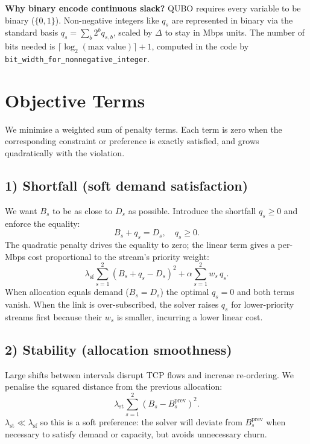 \documentclass[11pt,a4paper]{article}
\begin{document}
\bigskip
\noindent\textbf{Why binary encode continuous slack?}
QUBO requires every variable to be binary ($\{0,1\}$).  Non-negative integers
like $q_s$ are represented in binary via the standard basis
$q_s = \sum_b 2^b q_{s,b}$, scaled by $\Delta$ to stay in Mbps units.
The number of bits needed is $\lceil\log_2(\text{max value})\rceil + 1$, computed
in the code by \texttt{bit\_width\_for\_nonnegative\_integer}.

\section*{Objective Terms}

We minimise a weighted sum of penalty terms.  Each term is zero when the
corresponding constraint or preference is exactly satisfied, and grows
quadratically with the violation.

\subsection*{1) Shortfall (soft demand satisfaction)}

We want $B_s$ to be as close to $D_s$ as possible.  Introduce the shortfall
$q_s \ge 0$ and enforce the equality:
\[
B_s + q_s = D_s,\quad q_s\ge 0.
\]
The quadratic penalty drives the equality to zero; the linear term gives a
per-Mbps cost proportional to the stream's priority weight:
\[
\lambda_{\text{sf}}\sum_{s=1}^2 (B_s + q_s - D_s)^2
+ \alpha\sum_{s=1}^2 w_s\, q_s.
\]
When allocation equals demand ($B_s = D_s$) the optimal $q_s = 0$ and both
terms vanish.  When the link is over-subscribed, the solver raises $q_s$ for
lower-priority streams first because their $w_s$ is smaller, incurring a
lower linear cost.

\subsection*{2) Stability (allocation smoothness)}

Large shifts between intervals disrupt TCP flows and increase re-ordering.
We penalise the squared distance from the previous allocation:
\[
\lambda_{\text{st}}\sum_{s=1}^2 (B_s - B_s^{\text{prev}})^2.
\]
$\lambda_{\text{st}} \ll \lambda_{\text{sf}}$ so this is a soft preference:
the solver will deviate from $B_s^{\text{prev}}$ when necessary to satisfy
demand or capacity, but avoids unnecessary churn.

\end{document}
